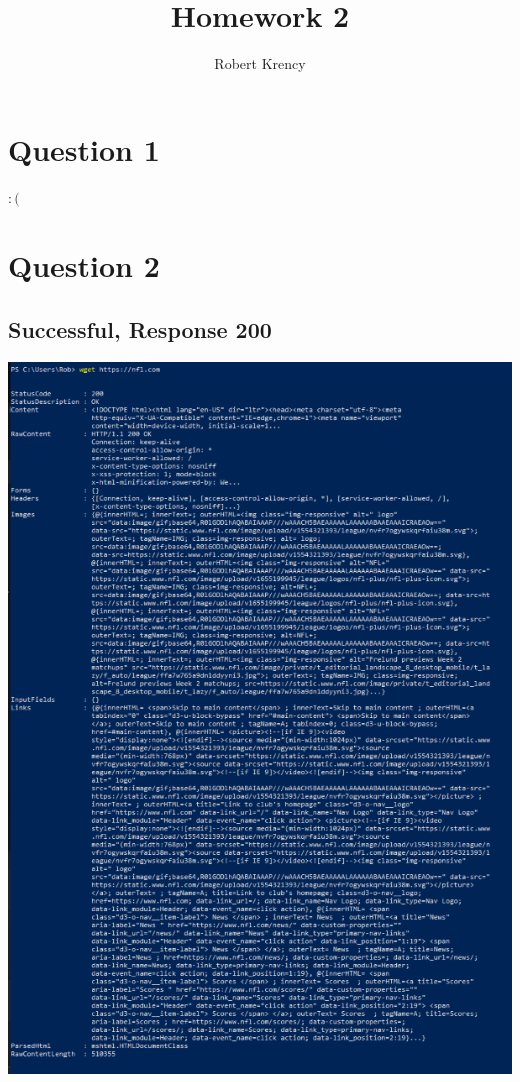 \documentclass{article}
\date{}
\author{Robert Krency}
\title{Homework 2}
\begin{document}
\maketitle
\thispagestyle{fancy}

\section*{Question 1}

$:($

\section*{Question 2}

\subsection*{Successful, Response 200}
\includegraphics{q2good.png}
\end{document}
